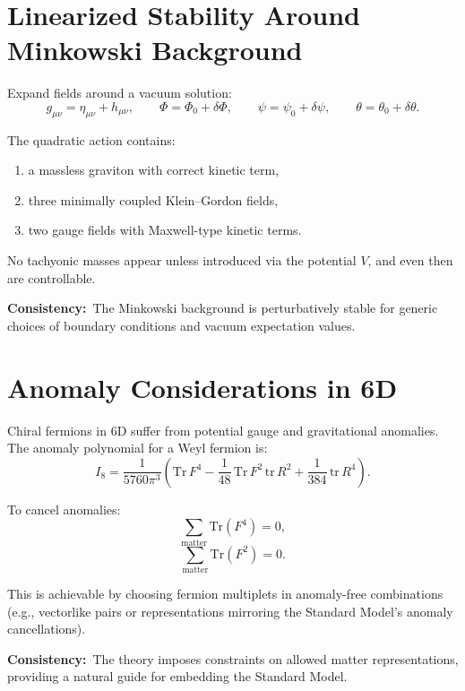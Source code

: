\documentclass[12pt]{article}
\begin{document}

\newpage
\section{Linearized Stability Around Minkowski Background}

Expand fields around a vacuum solution:
\[
g_{\mu\nu} = \eta_{\mu\nu} + h_{\mu\nu},
\qquad
\Phi = \Phi_0 + \delta\Phi,
\qquad
\psi = \psi_0 + \delta\psi,
\qquad
\theta = \theta_0 + \delta\theta.
\]

The quadratic action contains:
\begin{enumerate}
\item a massless graviton with correct kinetic term,
\item three minimally coupled Klein–Gordon fields,
\item two gauge fields with Maxwell-type kinetic terms.
\end{enumerate}

No tachyonic masses appear unless introduced via the potential \(V\), and even
then are controllable.

\noindent\textbf{Consistency:}\
The Minkowski background is perturbatively stable for generic choices of
boundary conditions and vacuum expectation values.


\newpage
\section{Anomaly Considerations in 6D}

Chiral fermions in 6D suffer from potential gauge and gravitational anomalies.
The anomaly polynomial for a Weyl fermion is:
\begin{equation}
I_8
=
\frac{1}{5760\pi^3}
\left(
\mathrm{Tr}\,F^4
- \frac{1}{48}\,\mathrm{Tr}\,F^2\,\mathrm{tr}\,R^2
+ \frac{1}{384}\,\mathrm{tr}\,R^4
\right).
\end{equation}

To cancel anomalies:
\[
\sum_{\text{matter}} \mathrm{Tr}(F^4) = 0,
\]
\[
\sum_{\text{matter}} \mathrm{Tr}(F^2) = 0.
\]

This is achievable by choosing fermion multiplets in anomaly-free combinations
(e.g., vectorlike pairs or representations mirroring the Standard Model's
anomaly cancellations).

\noindent\textbf{Consistency:}\
The theory imposes constraints on allowed matter representations, providing a
natural guide for embedding the Standard Model.
\end{document}
